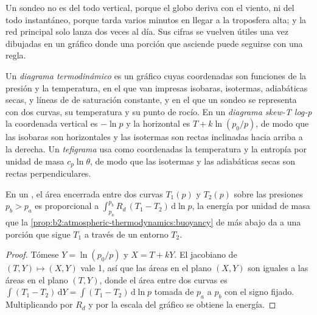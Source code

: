 Un sondeo no es del todo vertical, porque el globo deriva con el viento, ni del todo
instantáneo, porque tarda varios minutos en llegar a la troposfera alta; y la red principal
solo lanza dos veces al día. Sus cifras se vuelven útiles una vez dibujadas en un gráfico
donde una porción que asciende puede seguirse con una regla.

\begin{definition}\label{def:b2:atmospheric-thermodynamics:diagram}
Un \emph{diagrama termodinámico} es un gráfico cuyas coordenadas son
funciones de la presión y la temperatura, en el que van impresas isobaras, isotermas, adiabáticas secas,  y líneas de  de saturación constante, y en el que un sondeo se
representa con dos curvas, su temperatura y su punto de rocío. En un \emph{diagrama skew-T
log-p} la coordenada vertical es $-\ln p$ y la horizontal es
$T + k\ln(p_0/p)$, de modo que las isobaras son horizontales y las isotermas son rectas inclinadas hacia arriba
a la derecha. Un \emph{tefigrama} usa como coordenadas la temperatura y la entropía por unidad
de masa $c_p\ln\theta$, de modo que las isotermas y las adiabáticas secas son rectas
perpendiculares.
\end{definition}

\begin{proposition}\label{prop:b2:atmospheric-thermodynamics:areas}
En un , el área encerrada entre dos curvas $T_1(p)$ y $T_2(p)$ sobre las
presiones $p_b > p_a$ es proporcional a $\int_{p_a}^{p_b} R_d\,(T_1 - T_2)\,\mathrm{d}\ln p$,
la energía por unidad de masa que la \cref{prop:b2:atmospheric-thermodynamics:buoyancy} de más abajo da a
una porción que sigue $T_1$ a través de un entorno $T_2$.
\end{proposition}

\begin{proof}
Tómese $Y = \ln(p_0/p)$ y $X = T + kY$. El jacobiano de $(T, Y) \mapsto (X, Y)$ vale 1, así que las áreas en
el plano $(X, Y)$ son iguales a las áreas en el plano $(T, Y)$, donde el área entre dos curvas es
$\int (T_1 - T_2)\,\mathrm{d}Y = \int (T_1 - T_2)\,\mathrm{d}\ln p$ tomada de $p_a$ a $p_b$
con el signo fijado. Multiplicando por $R_d$ y por la escala del gráfico se obtiene la energía.
\end{proof}

